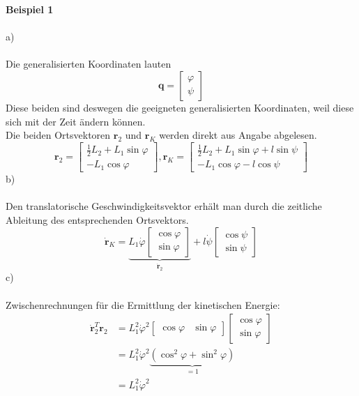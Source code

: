 \textbf{Beispiel 1} \\ \\
a)\\ \\
Die generalisierten Koordinaten lauten
\[
	\textbf{q} = \left[ \begin{matrix}
		\varphi \\
		\psi
	\end{matrix}\right]
\]
Diese beiden sind deswegen die geeigneten generalisierten Koordinaten, weil diese sich mit der Zeit ändern können. \\ 
Die beiden Ortsvektoren $\textbf{r}_2$ und $\textbf{r}_K$ werden direkt aus Angabe abgelesen.
\[
	\textbf{r}_2 = \left[\begin{matrix}
		\frac{1}{2} L_2 + L_1 \sin\varphi \\
		-L_1\cos\varphi
	\end{matrix}\right] , 
	\textbf{r}_K = \left[\begin{matrix}
		\frac{1}{2} L_2 + L_1\sin\varphi + l\sin\psi \\
		-L_1\cos\varphi - l\cos\psi
	\end{matrix}\right]
\]
b) \\ \\
Den translatorische Geschwindigkeitsvektor erhält man durch die zeitliche Ableitung des entsprechenden Ortsvektors.
\[
	\dot{\textbf{r}}_K = \underbrace{L_1\dot{\varphi}\left[\begin{matrix}
		\cos\varphi \\
		\sin\varphi
	\end{matrix}\right]}_{\dot{\textbf{r}}_2}
	+
	l\dot{\psi}\left[\begin{matrix}
		\cos\psi\\
		\sin\psi
	\end{matrix}\right]
\]
c) \\ \\
Zwischenrechnungen für die Ermittlung der kinetischen Energie:
\begin{align*}
	\dot{\textbf{r}}_2^T\textbf{r}_2 &= L_1^2 \dot{\varphi}^2 \left[\begin{matrix}
	 \cos\varphi & \sin\varphi
	\end{matrix}\right]
	\left[\begin{matrix}
		\cos\varphi \\
		\sin\varphi
	\end{matrix}\right] \\
	&= L_1^2\dot{\varphi}^2\underbrace{\left(\cos^2\varphi + \sin^2\varphi\right)}_{=1} \\
	&= L_1^2\dot{\varphi}^2
\end{align*}
